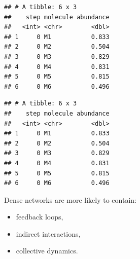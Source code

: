 \documentclass[
  oneside,
  openany]{book}
\newenvironment{Shaded}{\begin{snugshade}}{\end{snugshade}}
\newcommand{\AttributeTok}[1]{\textcolor[rgb]{0.13,0.29,0.53}{#1}}
\newcommand{\DecValTok}[1]{\textcolor[rgb]{0.00,0.00,0.81}{#1}}
\newcommand{\FloatTok}[1]{\textcolor[rgb]{0.00,0.00,0.81}{#1}}
\newcommand{\FunctionTok}[1]{\textcolor[rgb]{0.13,0.29,0.53}{\textbf{#1}}}
\newcommand{\NormalTok}[1]{#1}
\newcommand{\OtherTok}[1]{\textcolor[rgb]{0.56,0.35,0.01}{#1}}
\newcommand{\SpecialCharTok}[1]{\textcolor[rgb]{0.81,0.36,0.00}{\textbf{#1}}}
\providecommand{\tightlist}{%
  \setlength{\itemsep}{0pt}\setlength{\parskip}{0pt}}
\begin{document}
\begin{Shaded}
\end{Shaded}

\begin{verbatim}
## # A tibble: 6 x 3
##    step molecule abundance
##   <int> <chr>        <dbl>
## 1     0 M1           0.833
## 2     0 M2           0.504
## 3     0 M3           0.829
## 4     0 M4           0.831
## 5     0 M5           0.815
## 6     0 M6           0.496
\end{verbatim}

\begin{Shaded}
\end{Shaded}

\begin{verbatim}
## # A tibble: 6 x 3
##    step molecule abundance
##   <int> <chr>        <dbl>
## 1     0 M1           0.833
## 2     0 M2           0.504
## 3     0 M3           0.829
## 4     0 M4           0.831
## 5     0 M5           0.815
## 6     0 M6           0.496
\end{verbatim}

Dense networks are more likely to contain:

\begin{itemize}
\tightlist
\item
  feedback loops,
\item
  indirect interactions,
\item
  collective dynamics.
\end{itemize}
\end{document}
